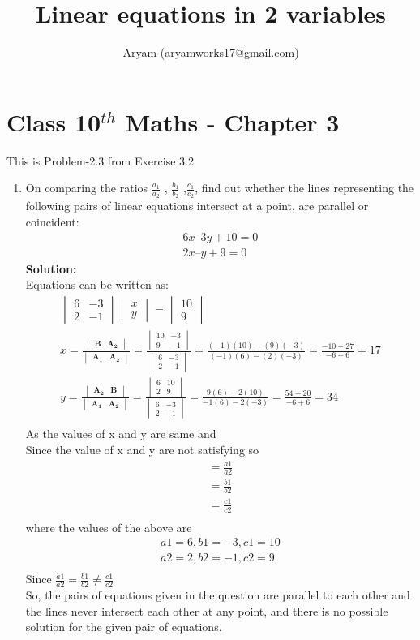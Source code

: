 \documentclass[10pt]{article}
\title{Linear equations in 2 variables}
\author{Aryam (aryamworks17@gmail.com)}
\newcommand{\mydet}[1]{\ensuremath{\begin{vmatrix}#1\end{vmatrix}}}
\newcommand{\solution}{\noindent \textbf{Solution: }}
\let\vec\mathbf
\begin{document}
\maketitle
\section*{Class 10$^{th}$ Maths - Chapter 3}
This is Problem-2.3 from Exercise 3.2
\begin{enumerate}
\item On comparing the ratios $\frac{a_1}{a_2}$ , $\frac{b_1}{b_2}$ ,$\frac{c_1}{c_2}$, find out whether the lines representing the following pairs of linear equations intersect at a point, are parallel or coincident:\\
\begin{align}
6x–3y +10=0\\
2x–y+9=0
\end{align}
\solution \\
Equations can be written as:\\
\begin{align}
\mydet{6&-3\\2&-1} \mydet{x\\y}= \mydet{10\\9}\\
 x= \frac{\mydet{\vec{B}&\vec {A_2}}}{\mydet{\vec{A_1}&\vec{A_2}}}
=\frac{\mydet{10&-3\\9&-1}}{\mydet{6&-3\\2&-1}}
=\frac{{(-1)(10) - (9)(-3)}}{{(-1)(6) - (2)(-3)}}
=\frac{-10+27}{-6+6}
=17\\
 y= \frac{\mydet{\vec{A_2}&\vec {B}}}{\mydet{\vec{A_1}&\vec{A_2}}}
=\frac{\mydet{6&10\\2&9}}{\mydet{6&-3\\2&-1}}
=\frac{9(6) - 2(10)}{-1(6) -2(-3)}
=\frac{54-20}{-6+6}
=34\\
\end{align}
As the values of x and y are same and\\
Since the value of x and y are not satisfying so\\
\begin{align}
=\frac{a1}{a2}\\
=\frac{b1}{b2}\\
=\frac{c1}{c2}\\
\end{align}
where the values of the above are\\
\begin{align}
a1 = 6, b1 = -3, c1 = 10\\
a2 = 2, b2 = -1, c2 = 9\\
\end{align}
Since $\frac{a1}{a2}    =     \frac{b1}{b2} \neq   \frac{c1}{c2}$ \\

So, the pairs of equations given in the question are parallel to each other and the lines never intersect each other at any point, and there is no possible solution for the given pair of equations.\\
\end{enumerate}
\end{document}
